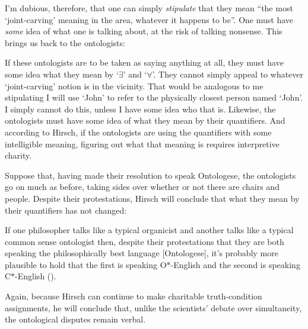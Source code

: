 \documentclass[11pt]{article}
\newenvironment{squote}{%
\begin{spacing}{1}
       	\begin{list}{}{%
\setlength{\labelwidth}{0pt}%
\rightmargin\leftmargin%
}
\item\relax
}{%
\end{list}%
\end{spacing}
}
\begin{document}
\begin{spacing}{1.25}
I'm dubious, therefore, that one can simply {\em stipulate} that they
mean ``the most `joint-carving' meaning in the area, whatever it
happens to be''.  One must have {\em some} idea of what one is talking
about, at the risk of talking nonsense.  This brings us back to the
ontologists:





If these ontologists are to be taken as saying anything at all, they
must have some idea what they mean by `$\exists$' and `$\forall$'.
They cannot simply appeal to whatever `joint-carving' notion is in the
vicinity.  That would be analogous to me stipulating I will use `John'
to refer to the physically closest person named `John'.  I simply
cannot do this, unless I have some idea who that is.  Likewise, the
ontologists must have some idea of what they mean by their
quantifiers.  And according to Hirsch, if the ontologists are using
the quantifiers with some intelligible meaning, figuring out what that
meaning is requires interpretive charity.

Suppose that, having made their resolution to speak Ontologese, the
ontologists go on much as before, taking sides over whether or not
there are chairs and people.  Despite their protestations, Hirsch will
conclude that what they mean by their quantifiers has not changed:

\begin{squote}
If one philosopher talks like a typical organicist and another talks
like a typical common sense ontologist then, despite their
protestations that they are both speaking the philosophically best
language [Ontologese], it's probably more plausible to hold that the
first is speaking O$\ast$-English and the second is speaking
C$\ast$-English (\citeyear[12]{hirsch2008}).
\end{squote}

Again, because Hirsch can continue to make charitable truth-condition
assignments, he will conclude that, unlike the scientists' debate over
simultaneity, the ontological disputes remain verbal.


\end{spacing}
\end{document}

